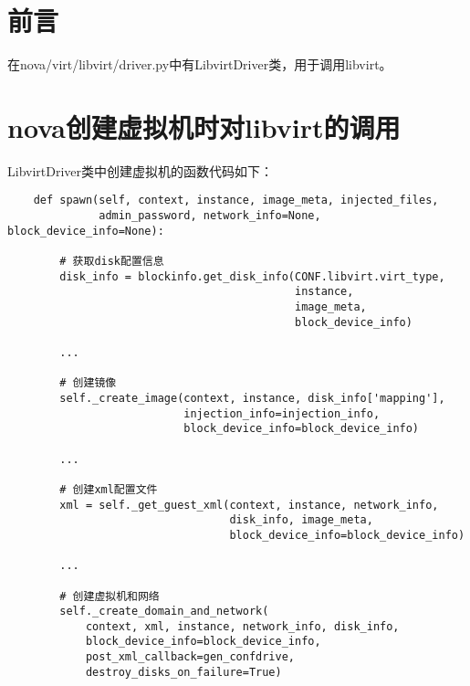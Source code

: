 \documentclass[a4paper,left=1.5cm,right=1.5cm,11pt]{article}
\begin{document}
\tableofcontents

\clearpage

\section{前言}
	在nova/virt/libvirt/driver.py中有LibvirtDriver类，用于调用libvirt。

\section{nova创建虚拟机时对libvirt的调用}
	LibvirtDriver类中创建虚拟机的函数代码如下：
	\begin{lstlisting}
	def spawn(self, context, instance, image_meta, injected_files,
              admin_password, network_info=None, block_device_info=None):
		
		# 获取disk配置信息 
        disk_info = blockinfo.get_disk_info(CONF.libvirt.virt_type,
                                            instance,
                                            image_meta,
                                            block_device_info)

        ...

		# 创建镜像
        self._create_image(context, instance, disk_info['mapping'],
                           injection_info=injection_info,
                           block_device_info=block_device_info)

        ...

		# 创建xml配置文件
        xml = self._get_guest_xml(context, instance, network_info,
                                  disk_info, image_meta,
                                  block_device_info=block_device_info)

		...

		# 创建虚拟机和网络
        self._create_domain_and_network(
            context, xml, instance, network_info, disk_info,
            block_device_info=block_device_info,
            post_xml_callback=gen_confdrive,
            destroy_disks_on_failure=True)
	\end{lstlisting}

\clearpage
\end{document}
